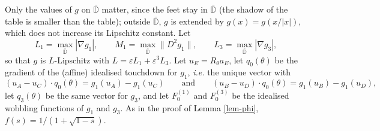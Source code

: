 \documentclass[a4paper,11pt,twoside,leqno]{article}
\newcommand{\ie}[0]{\emph{i.e.} }
\newcommand{\eps}[0]{\varepsilon}
\numberwithin{equation}{section}
\begin{document}
Only the values of $g$ on $\bar{\mathbb{D}}$ matter, since the feet stay in $\bar{\mathbb{D}}$ (the shadow of the table is smaller than the table); outside $\bar{\mathbb{D}}$, $g$ is extended by $g(x) = g(x/|x|)$, which does not increase its Lipschitz constant. Let
\[
L_1 = \max_{\bar{\mathbb{D}}} |\nabla g_1|,
\qquad
M_1 = \max_{\bar{\mathbb{D}}} \|D^2 g_1\|,
\qquad
L_3 = \max_{\bar{\mathbb{D}}} |\nabla g_3|,
\]
so that $g$ is $L$-Lipschitz with $L = \eps L_1 + \eps^3 L_3$. Let $u_E = R_\theta a_E$, let $q_0(\theta)$ be the gradient of the (affine) idealised touchdown for $g_1$, \ie the unique vector with
\[
(u_A - u_C)\cdot q_0(\theta) = g_1(u_A) - g_1(u_C)
\qquad \text{and} \qquad
(u_B - u_D)\cdot q_0(\theta) = g_1(u_B) - g_1(u_D),
\]
let $q_3(\theta)$ be the same vector for $g_3$, and let $F_0^{(1)}$ and $F_0^{(3)}$ be the idealised wobbling functions of $g_1$ and $g_3$. As in the proof of Lemma \ref{lem-phi}, $f(s) = 1/(1+\sqrt{1-s})$.
\end{document}
